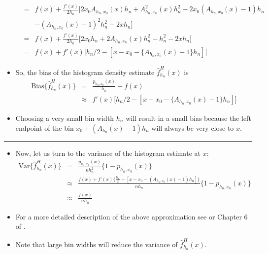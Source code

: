 \documentclass[]{book}
\begin{document}
\begin{itemize}
\begin{eqnarray}
  &=& f(x) + \frac{f'(x)}{2h_{n}}\Big[ 2x_{0}A_{h_{n}, x_{0}}(x)h_{n} + A_{h_{n}, x_{0}}^{2}(x)h_{n}^{2} - 2x_{0}(A_{h_{n}, x_{0}}(x)-1)h_{n}  \nonumber \\
  & & - (A_{h_{n}, x_{0}}(x)-1)^{2}h_{n}^{2} - 2xh_{n} \Big] \nonumber \\
  &=& f(x) + \frac{f'(x)}{2h_{n}}\Big[ 2x_{0}h_{n} + 2A_{h_{n}, x_{0}}(x)h_{n}^{2} - h_{n}^{2} - 2xh_{n} \Big] \nonumber \\
  &=& f(x) + f'(x)\Big[ h_{n}/2 - [ x - x_{0} - \{ A_{h_{n}, x_{0}}(x) - 1 \}h_{n} ] \Big] \nonumber
  \end{eqnarray}
\item
  So, the bias of the histogram density estimate \(\hat{f}_{h_{n}}^{H}(x)\) is
  \begin{eqnarray}
  \textrm{Bias}\{ \hat{f}_{h_{n}}^{H}(x) \} 
  &=& \frac{ p_{h_{n}, x_{0}}(x) }{ h_{n} } - f(x)  \nonumber \\
  &\approx& f'(x)\Big[ h_{n}/2 - [ x - x_{0} - \{ A_{h_{n}, x_{0}}(x) - 1 \}h_{n} ] \Big] 
  \label{eq:approx-bias-hist}
  \end{eqnarray}
\item
  Choosing a very small bin width \(h_{n}\) will result in a small bias because the left endpoint of the
  bin \(x_{0} + (A_{h_{n}}(x) - 1)h_{n}\) will always be very close to \(x\).
\end{itemize}

\begin{center}\rule{0.5\linewidth}{\linethickness}\end{center}

\begin{itemize}
\item
  Now, let us turn to the variance of the histogram estimate at \(x\):
  \begin{eqnarray}
  \textrm{Var}\{ \hat{f}_{h_{n}}^{H}(x) \} &=& \frac{p_{h_{n}, x_{0}}(x) }{nh_{n}^{2}}\{1 - p_{h_{n}, x_{0}}(x) \}  \nonumber \\
  &\approx& \frac{f(x) + f'(x)\{ \tfrac{h_{n}}{2} - [ x - x_{0} - (A_{h_{n}, x_{0}}(x) - 1)h_{n} ] \}}{nh_{n}}\{1 - p_{h_{n}, x_{0}}(x)\}  \nonumber \\
  &\approx& \frac{f(x)}{n h_{n} }
  \label{eq:approx-var-hist}
  \end{eqnarray}
\item
  For a more detailed description of the above approximation see \citet{scott1979} or Chapter 6 of \citet{wasserman2006}.
\item
  Note that large bin widths will reduce the variance of \(\hat{f}_{h_{n}}^{H}(x)\).
\end{itemize}
\end{document}

